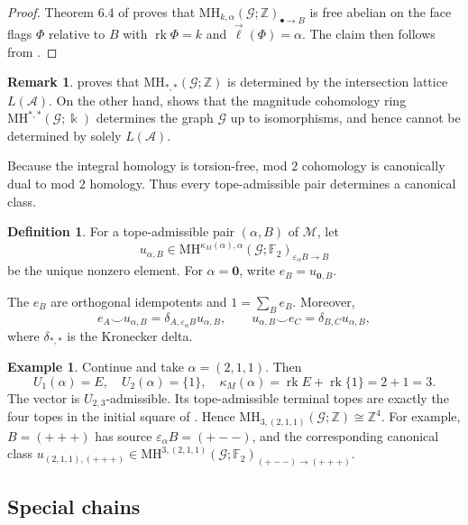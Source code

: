 \documentclass[10pt]{amsart}
\theoremstyle{plain}
\theoremstyle{definition}
\newtheorem{definition}[theorem]{Definition}
\newtheorem{example}[theorem]{Example}
\newtheorem{remark}[theorem]{Remark}
\newcommand{\zero}{\mathbf{0}}
\newcommand{\ZZ}{\mathbb{Z}}
\newcommand{\A}{\mathcal{A}}
\newcommand{\G}{\mathcal{G}}
\newcommand{\MH}{\mathrm{MH}}
\newcommand{\M}{\mathcal{M}}
\newcommand{\rk}{\operatorname{rk}}
\newcommand{\eps}{\varepsilon}
\newcommand{\Ftwo}{\mathbb F_2}
\newcommand{\kk}{\Bbbk}
\begin{document}
\begin{proof}
Theorem 6.4 of \cite{Koizumi2026a} proves that $\MH_{k,\alpha}(\G;\ZZ)_{\bullet\to B}$ is free abelian on the face flags $\Phi$ relative to $B$ with $\rk\Phi=k$ and $\vec{\ell}(\Phi)=\alpha$.  The claim then follows from .
\end{proof}

\begin{remark}
\cite[Corollary 6.7]{Koizumi2026a} proves that $\MH_{*,*}(\G;\ZZ)$ is determined by the intersection lattice $L(\A)$. On the other hand,  shows that the magnitude cohomology ring $\MH^{*,*}(\G;\kk)$ determines the graph $\G$ up to isomorphisms, and hence cannot be determined by solely $L(\A)$.
\end{remark}


Because the integral homology is torsion-free, mod $2$ cohomology is canonically dual to mod $2$ homology. Thus every tope-admissible pair determines a canonical class.

\begin{definition}\label{u-class}
For a tope-admissible pair $(\alpha,B)$ of $\M$, let
\[
u_{\alpha,B}\in\MH^{\kappa_M(\alpha),\alpha}(\G;\Ftwo)_{\eps_\alpha B\to B}
\]
be the unique nonzero element. For $\alpha=\zero$, write $e_B=u_{\zero,B}$.
\end{definition}

The $e_B$ are orthogonal idempotents and $1=\sum_Be_B$. Moreover,
\[
e_A\smile u_{\alpha,B}=\delta_{A,\eps_\alpha B}u_{\alpha,B}, \qquad  u_{\alpha,B}\smile e_C=\delta_{B,C}u_{\alpha,B},
\]
where $\delta_{*,*}$ is the Kronecker delta.

\begin{example}
Continue  and take $\alpha=(2,1,1)$. Then
\[
U_1(\alpha)=E,\quad U_2(\alpha)=\{1\}, \quad  \kappa_M(\alpha)=\rk E+\rk\{1\}=2+1=3.
\]
The vector is $U_{2,3}$-admissible. Its tope-admissible terminal topes are exactly the four topes in the initial square of . Hence $\MH_{3,(2,1,1)}(\G;\ZZ)\cong\ZZ^4$. For example, $B=(+++)$ has source $\eps_\alpha B=(+--)$, and the corresponding canonical class $u_{(2,1,1),(+++)}\in\MH^{3,(2,1,1)}(\G;\Ftwo)_{(+--)\to(+++)}$.
\end{example}



\subsection{Special chains}
\end{document}
